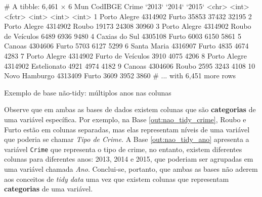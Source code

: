 \documentclass[12pt,openright,oneside,a4paper,english,french,spanish]{abntex2}
\numberwithin{table}{section} %
\numberwithin{figure}{section} %
\begin{document}
\begin{routput}
\begin{Schunk}
\begin{Soutput}
# A tibble: 6,461 × 6
             Mun CodIBGE             Crime `2013` `2014` `2015`
           <chr>   <int>            <fctr>  <int>  <int>  <int>
1   Porto Alegre 4314902             Furto  35853  37432  32195
2   Porto Alegre 4314902             Roubo  19173  24308  30960
3   Porto Alegre 4314902 Roubo de Veículos   6489   6936   9480
4  Caxias do Sul 4305108             Furto   6003   6150   5861
5         Canoas 4304606             Furto   5703   6127   5299
6    Santa Maria 4316907             Furto   4835   4674   4283
7   Porto Alegre 4314902 Furto de Veículos   3910   4075   4206
8   Porto Alegre 4314902       Estelionato   4921   4974   4182
9         Canoas 4304606             Roubo   2595   3243   4108
10 Novo Hamburgo 4313409             Furto   3609   3952   3860
# ... with 6,451 more rows
\end{Soutput}
\end{Schunk}
\caption{Exemplo de base não-tidy: múltiplos anos nas colunas}
\label{out:nao_tidy_ano}
\end{routput}

Observe que em ambas as bases de dados existem colunas que são \textbf{categorias} de uma variável específica. Por exemplo, na Base \ref{out:nao_tidy_crime}, Roubo e Furto estão em colunas separadas, mas elas representam níveis de uma variável que poderia se chamar \textit{Tipo de Crime}. A Base \ref{out:nao_tidy_ano} apresenta a variável \texttt{Crime} que representa o tipo de crime, no entanto, existem diferentes colunas para diferentes anos: 2013, 2014 e 2015, que poderiam ser agrupadas em uma variável chamada \textit{Ano}. Conclui-se, portanto, que ambas as bases não aderem aos conceitos de \textit{tidy data} uma vez que existem colunas que representam \textbf{categorias} de uma variável.
\end{document}
